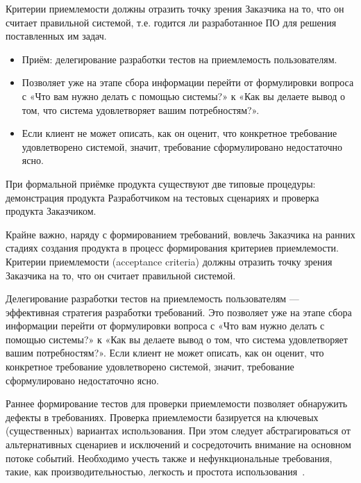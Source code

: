 \documentclass{../industrial-development}
\begin{document}
{\begin{frame}
  \begin{block}{}
\alert{Критерии приемлемости} должны отразить точку зрения Заказчика на то, что он считает правильной системой, т.е. годится ли разработанное ПО для решения поставленных им задач.
	  \end{block}
		\begin{itemize}
\item Приём: делегирование разработки тестов на приемлемость пользователям. 
\item Позволяет уже на этапе сбора информации перейти от формулировки вопроса с
\alert{«Что вам нужно делать с помощью системы?»} к \alert{«Как вы делаете вывод о том, что система удовлетворяет вашим
потребностям?»}.
\item Если клиент не может описать, как он оценит, что конкретное требование удовлетворено системой, значит, требование сформулировано недостаточно ясно.
\end{itemize}
\end{frame}


\lecturenotes

При формальной приёмке продукта существуют две типовые процедуры: демонстрация продукта Разработчиком на тестовых сценариях и проверка продукта Заказчиком.

Крайне важно, наряду с формированием требований, вовлечь Заказчика на ранних стадиях создания продукта в процесс формирования критериев приемлемости. \alert{Критерии приемлемости (acceptance criteria)} должны отразить точку зрения Заказчика на то, что он считает правильной системой.

Делегирование разработки тестов на приемлемость пользователям — эффективная стратегия разработки требований. Это позволяет уже на этапе сбора информации перейти от формулировки вопроса с «Что вам нужно делать с помощью системы?» к «Как вы делаете вывод о том, что система удовлетворяет вашим потребностям?». Если клиент не может описать, как он оценит, что конкретное требование удовлетворено системой,
значит, требование сформулировано недостаточно ясно.

Раннее формирование тестов для проверки приемлемости позволяет обнаружить дефекты в требованиях. Проверка приемлемости базируется на ключевых (существенных) вариантах использования. При этом следует абстрагироваться от альтернативных сценариев и исключений и сосредоточить внимание на основном потоке событий. Необходимо учесть также и нефункциональные требования, такие, как производительностью, легкость и простота использования~\cite[с.~68]{Maglinec}.


}
\end{document}
